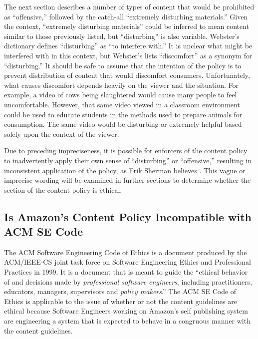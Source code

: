 \documentclass[11pt]{article}
\begin{document}
\begin{multicols}{2}
The next section describes a number of types of content that would be prohibited as ``offensive,'' followed by the catch-all ``extremely disturbing materials.'' Given the context, ``extremely disturbing materials'' could be inferred to mean content similar to those previously listed, but ``disturbing'' is also variable.  Webster's dictionary defines ``disturbing'' as ``to interfere with.'' \cite{WebsterOnlineDict}  It is unclear what might be interfered with in this context, but Webster's lists ``discomfort'' as a synonym for ``disturbing.''  It should be safe to assume that the intention of the policy is to prevent distribution of content that would discomfort consumers.  Unfortunately, what causes discomfort depends heavily on the viewer and the situation.  For example, a video of cows being slaughtered would cause many people to feel uncomfortable.  However, that same video viewed in a classroom environment could be used to educate students in the methods used to prepare animals for consumption.  The same video would be disturbing or extremely helpful based solely upon the context of the viewer. 

Due to preceding impreciseness, it is possible for enforcers of the content policy to inadvertently apply their own sense of ``disturbing'' or ``offensive,'' resulting in inconsistent application of the policy, as Erik Sherman believes \cite{ShermanAmazonExecs}.  This vague or imprecise wording will be examined in further sections to determine whether the section of the content policy is ethical.

\subsection{Is Amazon's Content Policy Incompatible with ACM SE Code}

The ACM Software Engineering Code of Ethics is a document produced by the ACM/IEEE-CS joint task force on Software Engineering Ethics and Professional Practices in 1999. \cite{SECode} It is a document that is meant to guide the ``ethical behavior of and decisions made by \emph{professional software engineers}, including practitioners, educators, managers, supervisors and \emph{policy makers}.'' \cite[Emphasis Mine]{SECode} The ACM SE Code of Ethics is applicable to the issue of whether or not the content guidelines are ethical because Software Engineers working on Amazon's self publishing system are engineering a system that is expected to behave in a congruous manner with the content guidelines. %


\end{multicols}
\end{document}
